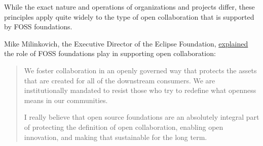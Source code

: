 While the exact nature and operations of organizations and projects differ, these principles apply quite widely to the type of open collaboration that is supported by FOSS foundations.

\begin{kaobox}[frametitle=FOSS foundations: protecting the definition of open collaboration]

Mike Milinkovich, the Executive Director of the Eclipse Foundation, \href{https://twitter.com/stephenrwalli/status/1358884485387808768}{explained} the role of FOSS foundations play in supporting open collaboration:

\begin{quote}

We foster collaboration in an openly governed way that protects the assets that are created for all of the downstream consumers. We are institutionally mandated to resist those who try to redefine what openness means in our communities.

I really believe that open source foundations are an absolutely integral part of protecting the definition of open collaboration, enabling open innovation, and making that sustainable for the long term.

\end{quote}

\end{kaobox}


